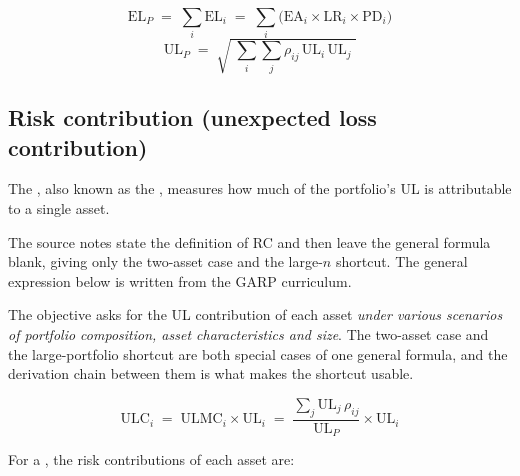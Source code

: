 \begin{crfmlbox}
\[ \mathrm{EL}_P \;=\; \sum_i \mathrm{EL}_i \;=\; \sum_i \bigl(\mathrm{EA}_i \times
   \mathrm{LR}_i \times \mathrm{PD}_i\bigr) \]
\[ \mathrm{UL}_P \;=\; \sqrt{\;\sum_i\sum_j \rho_{ij}\,\mathrm{UL}_i\,\mathrm{UL}_j\;} \]
\end{crfmlbox}

\subsection*{Risk contribution (unexpected loss contribution)}

The , also known as the , measures how much of the portfolio's UL is attributable to a
single asset.

\gapbadge

{\footnotesize\color{FRMGrey}The source notes state the definition of RC and then
leave the general formula blank, giving only the two-asset case and the large-$n$
shortcut. The general expression below is written from the GARP curriculum.}

\begin{crgapbox}
The objective asks for the UL contribution of each asset \emph{under various
scenarios of portfolio composition, asset characteristics and size}. The two-asset
case and the large-portfolio shortcut are both special cases of one general
formula, and the derivation chain between them is what makes the shortcut usable.
\end{crgapbox}

\begin{crfmlbox}
\[ \mathrm{ULC}_i \;=\; \mathrm{ULMC}_i \times \mathrm{UL}_i
   \;=\; \frac{\displaystyle\sum_{j} \mathrm{UL}_j\,\rho_{ij}}{\mathrm{UL}_P}\times \mathrm{UL}_i \]
\end{crfmlbox}

For a , the risk contributions of each asset are:

